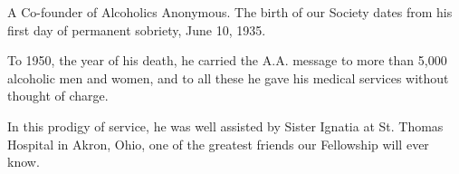 

\bbChapterPreamble




\begin{biblechapter}
    A Co-founder of Alcoholics Anonymous.
\verse The birth of our Society 
    dates from his first day of permanent sobriety, 
    June 10, 1935.

\verse To 1950, the year of his death, 
    he carried the A.A. message  
    to  more  than  5,000  alcoholic  men  and women, 
    and to all these he gave his medical services
    without thought of charge.

\verse In this prodigy of service, 
    he was well assisted by Sister Ignatia 
    at St. Thomas Hospital in Akron, Ohio,
    one of the greatest friends our Fellowship will ever know.
\end{biblechapter}



